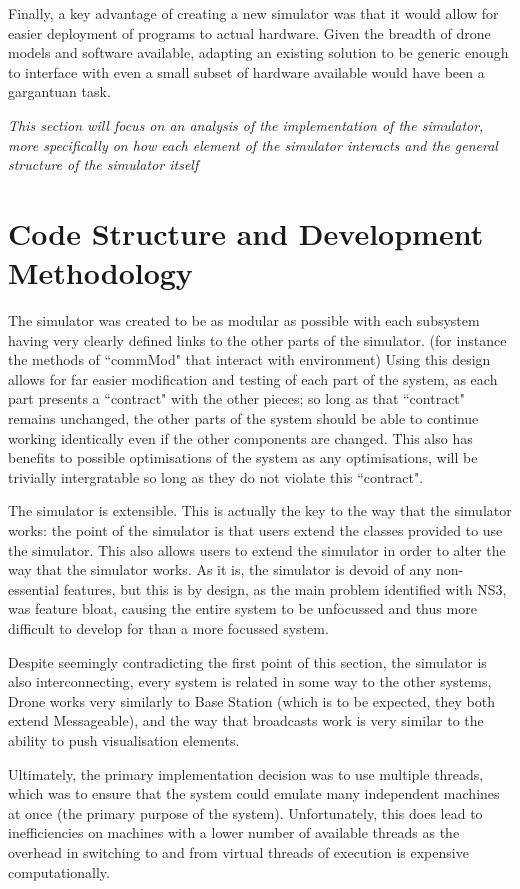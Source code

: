 Finally, a key advantage of creating a new simulator was that it would allow for easier deployment of programs to actual hardware. Given the breadth of drone models and software available, adapting an existing solution to be generic enough to interface with even a small subset of hardware available would have been a gargantuan task.

\emph{This section will focus on an analysis of the implementation of the simulator, more specifically on how each element of the simulator interacts and the general structure of the simulator itself}

\section{Code Structure and Development Methodology}
	The simulator was created to be as modular as possible with each subsystem having very clearly defined
	links to the other parts of the simulator. (for instance the methods of ``commMod" that interact
	with environment) Using this design allows for far easier modification and testing of each part
	of the system, as each part presents a ``contract" with the other pieces; so long as that ``contract"
	remains unchanged, the other parts of the system should be able to continue working identically
	even if the other components are changed. This also has benefits to possible optimisations of the system
	as any optimisations, will be trivially intergratable so long as they do not violate this ``contract".

	The simulator is extensible. This is actually the key to the way that the simulator works: the point
	of the simulator is that users extend the classes provided to use the simulator. This also
	allows users to extend the simulator in order to alter the way that the simulator works. As it is,
	the simulator is devoid of any non-essential features, but this is by design, as the main problem
	identified with NS3, was feature bloat, causing
	the entire system to be unfocussed and thus more difficult to develop for than a more focussed system.

	Despite seemingly contradicting the first point of this section, the simulator is also interconnecting,
	every system is related in some way to the other systems, Drone works very similarly to Base Station
	(which is to be expected, they both extend Messageable), and the way that broadcasts work is very similar
	to the ability to push visualisation elements.

	Ultimately, the primary implementation decision was to use multiple threads, which was to ensure that
	the system could emulate many independent machines at once (the primary purpose of the system).
	Unfortunately, this does lead to inefficiencies on machines with a lower number of available threads as
	the overhead in switching to and from virtual threads of execution is expensive computationally.

